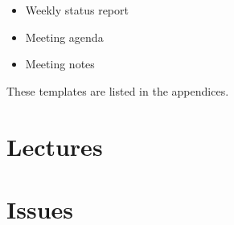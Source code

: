 \begin{itemize}
\item Weekly status report
\item Meeting agenda
\item Meeting notes
\end{itemize}

These templates are listed in the appendices.



\section{Lectures}
\section{Issues}


